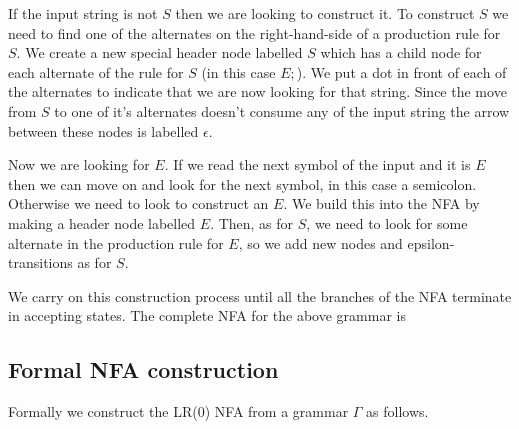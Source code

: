 If the input string is not $S$ then we are looking to construct it. 
To construct $S$ we need to find one of the
alternates on the right-hand-side of a production rule for $S$.
We create a new special header node labelled $S$ which has a child node
for each alternate of the rule for $S$ (in this case $E ;$). We put
a dot in front of each of the alternates to indicate that we are now looking 
for that string. Since the move from $S$ to one of it's alternates doesn't 
consume any of the input string the arrow between these nodes is labelled
$\epsilon$.
\begin{center}
\footnotesize

\end{center}

Now we are looking for $E$. If we read the next symbol of the input
and it is $E$ then we can move on and look for the next symbol, in this
case a semicolon. Otherwise we need to look to construct an $E$. We build
this into the NFA by making a header node labelled $E$.
Then, as for $S$, we need to look
for some alternate in the production rule for $E$, so we add new nodes
and epsilon-transitions as for $S$. 
\begin{center}
\footnotesize

\end{center}

We carry on this construction process until all the branches of the NFA
terminate in accepting states. The complete NFA for the above grammar is
\begin{center}
\footnotesize

\end{center}

\subsection{Formal NFA construction}

Formally we construct the LR(0) NFA from a grammar $\Gamma$ as
follows.


